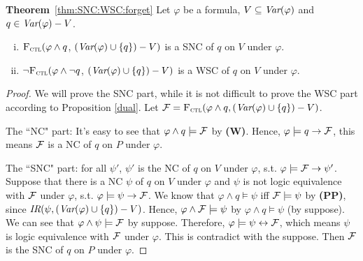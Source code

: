 \documentclass{article}
\begin{document}
\textbf{Theorem}~\ref{thm:SNC:WSC:forget} Let $\varphi$ be a formula, $V\subseteq\textit{Var}(\varphi)$ and $q\in\textit{Var}(\varphi)- V$.
 \begin{enumerate}[(i)]
   \item ${\textsc{F}_{\textsc{ctl}}} (\varphi \land q$, $(\textit{Var}(\varphi) \cup \{q\})- V)$
   is a SNC of $q$ on $V$ under $\varphi$.
   \item  $\neg{\textsc{F}_{\textsc{ctl}}} (\varphi \land \neg q$, $(\textit{Var}(\varphi) \cup \{q\})- V)$
   is a WSC of $q$ on $V$ under $\varphi$.
 \end{enumerate}
\begin{proof}
 We will prove the SNC part, while it is not difficult to prove the WSC part according to Proposition \ref{dual}.
 Let ${\cal F}={\textsc{F}_{\textsc{ctl}}}(\varphi \wedge q, (\textit{Var}(\varphi) \cup \{q\})- V)$.

   The ``NC" part: It's easy to see that $\varphi \wedge q \models {\cal F}$ by {\bfseries (W)}. Hence, $\varphi\models q \rightarrow {\cal F}$, this means
   ${\cal F}$ is a NC of $q$ on $P$ under $\varphi$.

    The ``SNC" part: for all $\psi'$, $\psi'$ is the NC of $q$ on $V$ under $\varphi$, s.t. $\varphi \models {\cal F} \rightarrow \psi'$.
    Suppose that there is a NC $\psi$ of $q$ on $V$ under $\varphi$ and $\psi$ is not logic equivalence with ${\cal F}$ under $\varphi$, s.t. $\varphi \models \psi \rightarrow {\cal F}$.
    We know that $\varphi \wedge q \models \psi$ iff ${\cal F} \models \psi$ by {\bfseries (PP)}, since $\emph{IR}(\psi, (\textit{Var}(\varphi) \cup \{q\})- V)$. Hence, $\varphi \wedge {\cal F} \models \psi$ by $\varphi \wedge q \models \psi$ (by suppose).
    We can see that $\varphi \wedge \psi \models {\cal F}$ by suppose. Therefore, $\varphi \models \psi \leftrightarrow {\cal F}$, which means $\psi$ is logic equivalence with ${\cal F}$ under $\varphi$.
    This is contradict with the suppose. Then ${\cal F}$ is the SNC of $q$ on $P$ under $\varphi$.
 \end{proof}
\end{document}
